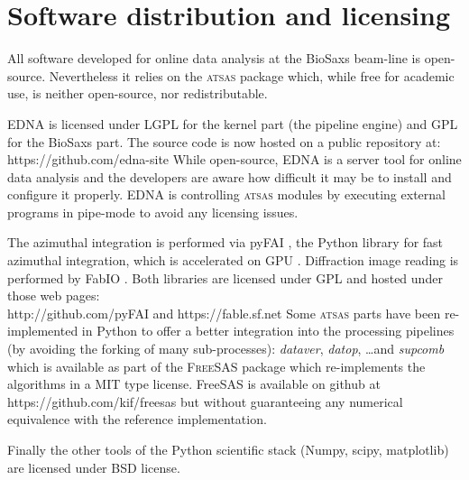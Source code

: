 \documentclass[preprint,pdf]{iucr}              %
\begin{document}



\section{Software distribution and licensing}

All software developed for online data analysis at the BioSaxs beam-line is
open-source.
Nevertheless it relies on the \textsc{atsas} package which, while free for
academic use, is neither open-source, nor redistributable.

EDNA is licensed under LGPL for the kernel part (the pipeline engine) and GPL
for the BioSaxs part. The source code is now hosted on a public
repository at:\\https://github.com/edna-site
While open-source, EDNA is a
server tool for online data analysis and the developers are aware how difficult
it may be to install and configure it properly. EDNA is controlling
\textsc{atsas} modules by executing external programs in pipe-mode to avoid any
licensing issues.

The azimuthal integration is performed via pyFAI \cite{pyFAI}, the Python library
for fast azimuthal integration, which is accelerated on GPU \cite{pyFAI_2015}.
Diffraction image reading is performed by FabIO \cite{fabio}.
Both libraries
are licensed under GPL and hosted under those web pages:\\
http://github.com/pyFAI and https://fable.sf.net
Some \textsc{atsas} parts have been re-implemented in Python to offer a better
integration into the processing pipelines (by avoiding the forking of many
sub-processes): \textit{dataver}, \textit{datop}, \ldots  and
\textit{supcomb} which is available as part of the \textsc{FreeSAS} package
which re-implements the algorithms in a MIT type license. FreeSAS is available
on github at https://github.com/kif/freesas but without guaranteeing any
numerical equivalence with the reference implementation.

Finally the other tools of the Python scientific stack (Numpy, scipy,
matplotlib) are licensed under BSD license.
\end{document}
